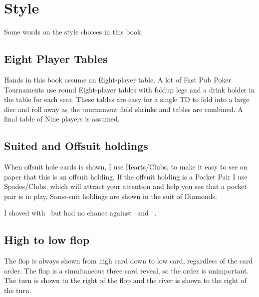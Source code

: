 \chapter{Style}


Some words on the style choices in this book.

\section*{Eight Player Tables}

Hands in this book assume an Eight-player table. A lot of Fast Pub
Poker Tournaments use round Eight-player tables with foldup legs and a
drink holder in the table for each seat. These tables are easy for a
single TD to fold into a large disc and roll away as the tournament
field shrinks and tables are combined. A final table of Nine players
is assumed.

\section*{Suited and Offsuit holdings}

When offsuit hole cards is shown, I use Hearts/Clubs, to make
it easy to see on paper that this is an offsuit holding. If the
offsuit holding is a Pocket Pair I use Spades/Clubs, which will
attract your attention and help you see that a pocket pair is in play.
Same-suit holdings are shown in the suit of Diamonds.

I shoved with \Ah\tenc\ but had no chance against \Ad\Kd\ and \Js\Jc\ .



\section*{High to low flop}

The flop is always shown from high card down to low card,
regardless of the card order. The flop is a simultaneous three card
reveal, so the order is unimportant. The turn is shown to the right of
the flop and the river is shown to the right of the turn.

